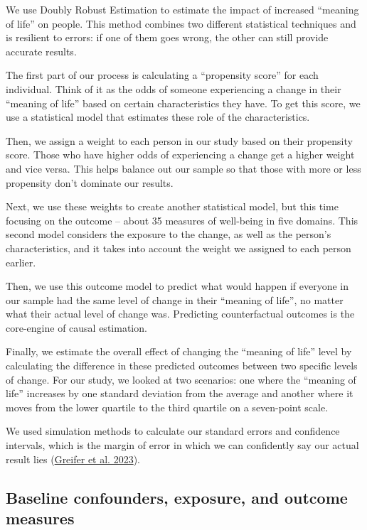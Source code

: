 \documentclass[
  singlecolumn]{report}
\begin{document}
We use Doubly Robust Estimation to estimate the impact of increased
``meaning of life'' on people. This method combines two different
statistical techniques and is resilient to errors: if one of them goes
wrong, the other can still provide accurate results.

The first part of our process is calculating a ``propensity score'' for
each individual. Think of it as the odds of someone experiencing a
change in their ``meaning of life'' based on certain characteristics
they have. To get this score, we use a statistical model that estimates
these role of the characteristics.

Then, we assign a weight to each person in our study based on their
propensity score. Those who have higher odds of experiencing a change
get a higher weight and vice versa. This helps balance out our sample so
that those with more or less propensity don't dominate our results.

Next, we use these weights to create another statistical model, but this
time focusing on the outcome -- about 35 measures of well-being in five
domains. This second model considers the exposure to the change, as well
as the person's characteristics, and it takes into account the weight we
assigned to each person earlier.

Then, we use this outcome model to predict what would happen if everyone
in our sample had the same level of change in their ``meaning of life'',
no matter what their actual level of change was. Predicting
counterfactual outcomes is the core-engine of causal estimation.

Finally, we estimate the overall effect of changing the ``meaning of
life'' level by calculating the difference in these predicted outcomes
between two specific levels of change. For our study, we looked at two
scenarios: one where the ``meaning of life'' increases by one standard
deviation from the average and another where it moves from the lower
quartile to the third quartile on a seven-point scale.

We used simulation methods to calculate our standard errors and
confidence intervals, which is the margin of error in which we can
confidently say our actual result lies
(\protect\hyperlink{ref-greifer2023}{Greifer et al. 2023}).

\hypertarget{baseline-confounders-exposure-and-outcome-measures}{%
\subsection{Baseline confounders, exposure, and outcome
measures}\label{baseline-confounders-exposure-and-outcome-measures}}
\end{document}
